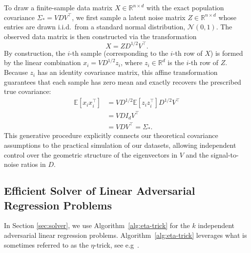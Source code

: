 \documentclass{article}
\begin{document}
To draw a finite-sample data matrix $X \in \mathbb{R}^{n \times d}$ with the exact population covariance $\Sigma_* = V D V^\top$, we first sample a latent noise matrix $Z \in \mathbb{R}^{n \times d}$ whose entries are drawn i.i.d.\ from a standard normal distribution, $\mathcal{N}(0,1)$. The observed data matrix is then constructed via the transformation
\begin{equation}
    X = Z D^{1/2} V^\top.
\end{equation}
By construction, the $i$-th sample (corresponding to the $i$-th row of $X$) is formed by the linear combination $x_i = V D^{1/2} z_i$, where $z_i \in \mathbb{R}^d$ is the $i$-th row of $Z$. Because $z_i$ has an identity covariance matrix, this affine transformation guarantees that each sample has zero mean and exactly recovers the prescribed true covariance:
\begin{align*}
    \mathbb{E}[x_i x_i^\top] &= V D^{1/2} \mathbb{E}[z_i z_i^\top] D^{1/2} V^\top \\
    &= V D I_d V^\top \\
    &= V D V^\top = \Sigma_*.
\end{align*}
This generative procedure explicitly connects our theoretical covariance assumptions to the practical simulation of our datasets, allowing independent control over the geometric structure of the eigenvectors in $V$ and the signal-to-noise ratios in $D$.

\subsection{Efficient Solver of Linear Adversarial Regression Problems}\label{app:eta-trick}
In Section \ref{sec:solver}, we use Algorithm~\ref{alg:eta-trick} for the $k$ independent adversarial linear regression problems. Algorithm~\ref{alg:eta-trick} leverages what is sometimes referred to as the $\eta$-trick, see e.g~\cite{ItrickReloadedMultiple2019}.
\end{document}
